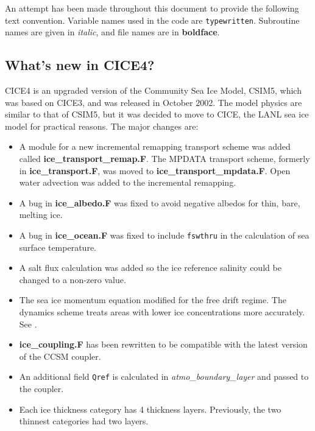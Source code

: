 An attempt has been made throughout this document to provide the following
text convention.  Variable names used in the code are {\tt typewritten}.
Subroutine names are given in {\it italic}, and file names are in {\bf boldface}.

\subsection{What's new in CICE4?}

CICE4 is an upgraded version of the Community Sea Ice Model, CSIM5, which was
 based on CICE3, and was released in October 2002.  
The model physics are similar to that of CSIM5, but it was decided to move to
CICE, the LANL sea ice model for practical reasons.  The major changes are:

\begin{itemize}

\item A module for a new incremental remapping transport scheme was added
      called {\bf ice\_transport\_remap.F}.  The MPDATA transport scheme,
      formerly in {\bf ice\_transport.F},  was moved to {\bf ice\_transport\_mpdata.F}.
      Open water advection was added to the incremental remapping.

\item A bug in {\bf ice\_albedo.F} was fixed to avoid negative albedos for thin,
      bare, melting ice.

\item A bug in {\bf ice\_ocean.F} was fixed to include {\tt fswthru} in the calculation
      of sea surface temperature.

\item A salt flux calculation was added so the ice reference salinity could
      be changed to a non-zero value.

\item The sea ice momentum equation modified for the free drift regime.  The
      dynamics scheme treats areas with lower ice concentrations more accurately.
      See \cite{hunk03}.

\item {\bf ice\_coupling.F} has been rewritten to be compatible with the latest
      version of the CCSM coupler.

\item An additional field {\tt Qref} is calculated in {\it atmo\_boundary\_layer}
      and passed to the coupler.

\item Each ice thickness category has 4 thickness layers. Previously, the two thinnest
      categories had two layers.


\end{itemize}
